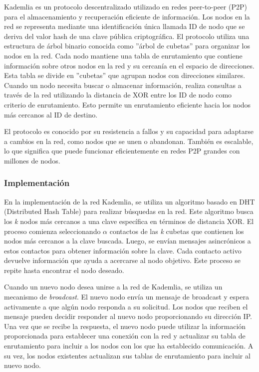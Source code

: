 \documentclass[10pt]{article} %
\begin{document}
	Kademlia \cite{kad} es un protocolo descentralizado utilizado en redes peer-to-peer (P2P) para el almacenamiento y recuperación eficiente de información. Los nodos en la red se representa mediante una identificación única llamada ID de nodo que se deriva del valor hash de una clave pública criptográfica. El protocolo utiliza una estructura de árbol binario conocida como ''árbol de cubetas'' para organizar los nodos en la red. Cada nodo mantiene una tabla de enrutamiento que contiene información sobre otros nodos en la red y su cercanía en el espacio de direcciones. Esta tabla se divide en ''cubetas'' que agrupan nodos con direcciones similares. Cuando un nodo necesita buscar o almacenar información, realiza consultas a través de la red utilizando la distancia de XOR entre los ID de nodo como criterio de enrutamiento. Esto permite un enrutamiento eficiente hacia los nodos más cercanos al ID de destino.
	
	El protocolo es conocido por su resistencia a fallos y su capacidad para adaptarse a cambios en la red, como nodos que se unen o abandonan. También es escalable, lo que significa que puede funcionar eficientemente en redes P2P grandes con millones de nodos.		
	

	
	\subsubsection{Implementaci\'on}
	
	En la implementación de la red Kademlia, se utiliza un algoritmo basado en DHT (Distributed Hash Table) para realizar búsquedas en la red. Este algoritmo busca los \textit{k} nodos más cercanos a una clave específica en términos de distancia XOR. El proceso comienza seleccionando $\alpha$ contactos de las \textit{k} cubetas que contienen los nodos más cercanos a la clave buscada. Luego, se envían mensajes asincrónicos a estos contactos para obtener información sobre la clave. Cada contacto activo devuelve información que ayuda a acercarse al nodo objetivo. Este proceso se repite hasta encontrar el nodo deseado.
	
	
	Cuando un nuevo nodo desea unirse a la red de Kademlia, se utiliza un mecanismo de \textit{broadcast}. El nuevo nodo envía un mensaje de broadcast y espera activamente a que alg\'un nodo responda a su solicitud. Los nodos que reciben el mensaje pueden decidir responder al nuevo nodo proporcionando su dirección IP. Una vez que se recibe la respuesta, el nuevo nodo puede utilizar la información proporcionada para establecer una conexión con la red y actualizar su tabla de enrutamiento para incluir a los nodos con los que ha establecido comunicación. A su vez,  los nodos existentes actualizan sus tablas de enrutamiento para incluir al nuevo nodo.
	
\end{document}
